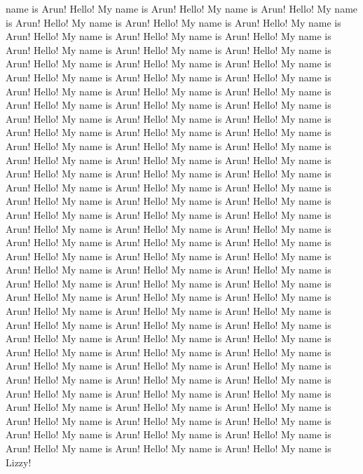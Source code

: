 \documentclass[10pt,a4paper,oneside]{article}
\begin{document}
name is Arun! 	Hello! My name is Arun!	Hello! My name is Arun!	Hello! My name is Arun!	Hello! My name is Arun!	Hello! My name is Arun!	Hello! My name is Arun!	Hello! My name is Arun!	Hello! My name is Arun!	Hello! My name is Arun!	Hello! My name is Arun!	Hello! My name is Arun!	Hello! My name is Arun!	Hello! My name is Arun!	Hello! My name is Arun!	Hello! My name is Arun!	Hello! My name is Arun!	Hello! My name is Arun!	Hello! My name is Arun!	Hello! My name is Arun!	Hello! My name is Arun! 	Hello! My name is Arun!	Hello! My name is Arun!	Hello! My name is Arun!	Hello! My name is Arun!	Hello! My name is Arun!	Hello! My name is Arun!	Hello! My name is Arun!	Hello! My name is Arun!	Hello! My name is Arun!	Hello! My name is Arun!	Hello! My name is Arun!	Hello! My name is Arun!	Hello! My name is Arun!	Hello! My name is Arun!	Hello! My name is Arun!	Hello! My name is Arun!	Hello! My name is Arun!	Hello! My name is Arun!	Hello! My name is Arun!	Hello! My name is Arun! 	Hello! My name is Arun!	Hello! My name is Arun!	Hello! My name is Arun!	Hello! My name is Arun!	Hello! My name is Arun!	Hello! My name is Arun!	Hello! My name is Arun!	Hello! My name is Arun!	Hello! My name is Arun!	Hello! My name is Arun!	Hello! My name is Arun!	Hello! My name is Arun!	Hello! My name is Arun!	Hello! My name is Arun!	Hello! My name is Arun!	Hello! My name is Arun!	Hello! My name is Arun!	Hello! My name is Arun!	Hello! My name is Arun!	Hello! My name is Arun! 	Hello! My name is Arun!	Hello! My name is Arun!	Hello! My name is Arun!	Hello! My name is Arun!	Hello! My name is Arun!	Hello! My name is Arun!	Hello! My name is Arun!	Hello! My name is Arun!	Hello! My name is Arun!	Hello! My name is Arun!	Hello! My name is Arun!	Hello! My name is Arun!	Hello! My name is Arun!	Hello! My name is Arun!	Hello! My name is Arun!	Hello! My name is Arun!	Hello! My name is Arun!	Hello! My name is Arun!	Hello! My name is Arun!	Hello! My name is Arun! 	Hello! My name is Arun!	Hello! My name is Arun!	Hello! My name is Arun!	Hello! My name is Arun!	Hello! My name is Arun!	Hello! My name is Arun!	Hello! My name is Arun!	Hello! My name is Arun!	Hello! My name is Arun!	Hello! My name is Arun!	Hello! My name is Arun!	Hello! My name is Arun!	Hello! My name is Arun!	Hello! My name is Arun!	Hello! My name is Arun!	Hello! My name is Arun!	Hello! My name is Arun!	Hello! My name is Arun!	Hello! My name is Lizzy!
\end{document}
